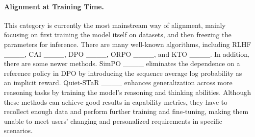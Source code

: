 \paragraph{\textbf{Alignment at Training Time.}}
This category is currently the most mainstream way of alignment, mainly focusing on first training the model itself on datasets, and then freezing the parameters for inference. 
There are many well-known algorithms, including RLHF ____, CAI ____, DPO ____, ORPO ____, and KTO ____. 
In addition, there are some newer methods. SimPO ____ eliminates the dependence on a reference policy in DPO by introducing the sequence average log probability as an implicit reward. Quiet-STaR ____ enhances generalization across more reasoning tasks by training the model's reasoning and thinking abilities. 
Although these methods can achieve good results in capability metrics, they have to recollect enough data and perform further training and fine-tuning, making them unable to meet users' changing and personalized requirements in specific scenarios.

\vspace{-1.5ex}


